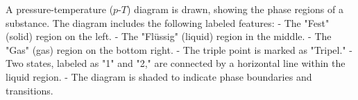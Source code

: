 A pressure-temperature (\(p\)-\(T\)) diagram is drawn, showing the phase regions of a substance. The diagram includes the following labeled features:  
- The "Fest" (solid) region on the left.  
- The "Flüssig" (liquid) region in the middle.  
- The "Gas" (gas) region on the bottom right.  
- The triple point is marked as "Tripel."  
- Two states, labeled as "1" and "2," are connected by a horizontal line within the liquid region.  
- The diagram is shaded to indicate phase boundaries and transitions.